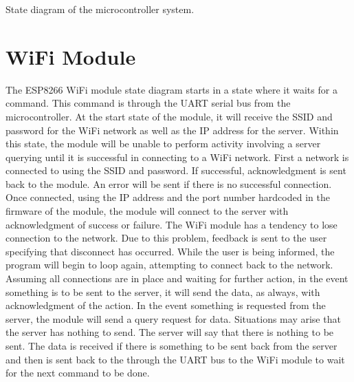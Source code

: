 \documentclass[12pt]{article}
\begin{document}
\begin{center}
State diagram of the microcontroller system.
\end{center}

\vspace*{5mm}
	
\section*{WiFi Module}
\indent

The ESP8266 WiFi module state diagram starts in a state where it waits for a command. This command is through the UART serial bus from the microcontroller. At the start state of the module, it will receive the SSID and password for the WiFi network as well as the IP address for the server. Within this state, the module will be unable to perform activity involving a server querying until it is successful in connecting to a WiFi network. First a network is connected to using the SSID and password. If successful, acknowledgment is sent back to the module. An error will be sent if there is no successful connection. Once connected, using the IP address and the port number hardcoded in the firmware of the module, the module will connect to the server with acknowledgment of success or failure. The WiFi module has a tendency to lose connection to the network. Due to this problem, feedback is sent to the user specifying that disconnect has occurred. While the user is being informed, the program will begin to loop again, attempting to connect back to the network. Assuming all connections are in place and waiting for further action, in the event something is to be sent to the server, it will send the data, as always, with acknowledgment of the action. In the event something is requested from the server, the module will send a query request for data. Situations may arise that the server has nothing to send. The server will say that there is nothing to be sent. The data is received if there is something to be sent back from the server and then is sent back to the through the UART bus to the WiFi module to wait for the next command to be done.

\vspace*{5mm}
\end{document}
